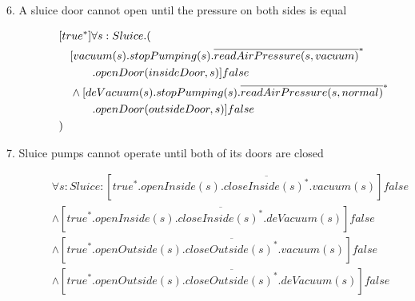 \begin{description}
 \item[6. A sluice door cannot open until the pressure on both sides is equal]
	\begin{align*}
&[true^*]\forall s:Sluice . ( \\
&\tab  [vacuum(s).stopPumping(s).\overline{readAirPressure(s, vacuum)}^*\\
&\tab\tab\tab.openDoor(insideDoor,s)]false \\
&\tab  \wedge [deVacuum(s).stopPumping(s).\overline{readAirPressure(s, normal)}^*\\
&\tab\tab\tab.openDoor(outsideDoor,s)]false \\
&)		
	\end{align*}
	
 \item[7. Sluice pumps cannot operate until both of its doors are closed]
 
 \begin{align*}
		&\forall s:Sluice :[true^*.openInside(s).\overline{closeInside(s)^*}.vacuum(s)]false \\
		& \wedge [true^*.openInside(s).\overline{closeInside(s)^*}.deVacuum(s)]false \\
		& \wedge [true^*.openOutside(s).\overline{closeOutside(s)^*}.vacuum(s)]false \\
		& \wedge [true^*.openOutside(s).\overline{closeOutside(s)^*}.deVacuum(s)]false \\
	\end{align*}


\end{description}
